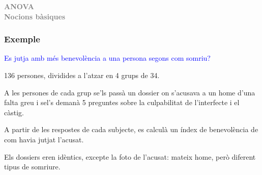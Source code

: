 \documentclass[12pt,t]{beamer}
\title[\red{Matemàtiques II}]{}
\author[]{}
\date{}
\newcommand{\blue}[1]{\textcolor{blue}{#1}}
\newcommand{\gray}[1]{\textcolor{gray}{#1}}
\renewcommand{\emph}[1]{{\color{red}#1}}
\theoremstyle{plain}
\theoremstyle{definition}
\begin{document}
\beamertemplatedotitem

\begin{frame}
\vfill
\begin{center}
\gray{\LARGE\bf ANOVA\\[1ex] Nocions bàsiques}
\end{center}
\end{frame}

\begin{frame}
\frametitle{Exemple}
\blue{Es jutja amb més benevolència a una persona segons com somriu?}\medskip

136 persones, dividides a l'atzar en 4 grups de 34.\medskip

A les persones de cada grup se'ls passà un dossier on s'acusava a un home d'una falta greu i sel's demanà 5 preguntes sobre la culpabilitat de l'interfecte i el càstig.\medskip

A partir de les  respostes de  cada subjecte, es calculà un \emph{índex de benevolència}  de com havia jutjat l'acusat.\medskip

Els dossiers eren idèntics, excepte la foto de l'acusat: mateix home, però diferent tipus de somriure.

\end{frame}
\end{document}
